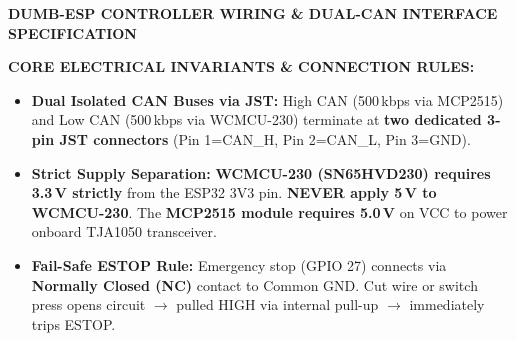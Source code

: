 \documentclass[10pt,a4paper]{article}
\begin{document}
\footnotesize

\begin{center}
  {\bfseries\normalsize DUMB-ESP CONTROLLER WIRING \& DUAL-CAN INTERFACE SPECIFICATION}
\end{center}
\vspace{-11pt}

\begin{tcolorbox}[bwalert]
\textbf{CORE ELECTRICAL INVARIANTS \& CONNECTION RULES:}
\begin{itemize}[leftmargin=1.2em, itemsep=0pt, topsep=0pt, parsep=0pt]
  \item \textbf{Dual Isolated CAN Buses via JST:} High CAN (500\,kbps via MCP2515) and Low CAN (500\,kbps via WCMCU-230) terminate at \textbf{two dedicated 3-pin JST connectors} (Pin 1=CAN\_H, Pin 2=CAN\_L, Pin 3=GND).
  \item \textbf{Strict Supply Separation:} \textbf{WCMCU-230 (SN65HVD230) requires 3.3\,V strictly} from the ESP32 3V3 pin. \textbf{NEVER apply 5\,V to WCMCU-230}. The \textbf{MCP2515 module requires 5.0\,V} on VCC to power onboard TJA1050 transceiver.
  \item \textbf{Fail-Safe ESTOP Rule:} Emergency stop (GPIO 27) connects via \textbf{Normally Closed (NC)} contact to Common GND. Cut wire or switch press opens circuit $\rightarrow$ pulled HIGH via internal pull-up $\rightarrow$ immediately trips ESTOP.
\end{itemize}
\end{tcolorbox}

\vspace{-8pt}
\end{document}
